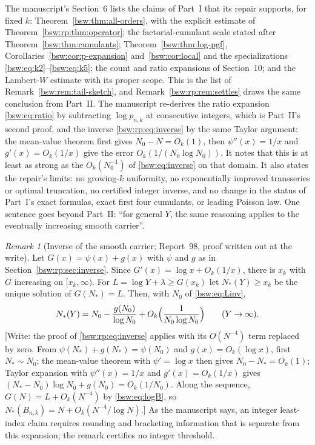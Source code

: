 \documentclass[11pt,letterpaper]{article}
\theoremstyle{definition}
\theoremstyle{remark}
\newtheorem{remark}[theorem]{Remark}
\begin{document}
The manuscript's Section~6 lists the claims of Part~I that its repair
supports, for fixed $k$: Theorem~\ref{bsw:thm:all-orders}, with the
explicit estimate of Theorem~\ref{bsw:rp:thm:operator}; the
factorial-cumulant scale stated after Theorem~\ref{bsw:thm:cumulants};
Theorem~\ref{bsw:thm:log-pgf}, Corollaries~\ref{bsw:cor:p-expansion}
and~\ref{bsw:cor:local} and the specializations
\eqref{bsw:eq:k2}--\eqref{bsw:eq:k5}; the count and ratio expansions of
Section~10; and the Lambert-$W$ estimate with its proper scope.  This is
the list of Remark~\ref{bsw:rem:tail-sketch}, and
Remark~\ref{bsw:rp:rem:settles} draws the same conclusion from Part~II.
The manuscript re-derives the ratio expansion \eqref{bsw:eq:ratio} by
subtracting $\log p_{n,k}$ at consecutive integers, which is Part~II's
second proof, and the inverse \eqref{bsw:rp:eq:inverse} by the same Taylor
argument: the mean-value theorem first gives $N_0-N=O_k(1)$, then
$\psi''(x)=1/x$ and $g'(x)=O_k(1/x)$ give the error
$O_k(1/(N_0\log N_0))$.  It notes that this is at least as strong as the
$O_k(N_0^{-1})$ of \eqref{bsw:eq:inverse} on that domain.  It also states
the repair's limits: no growing-$k$ uniformity, no exponentially improved
transseries or optimal truncation, no certified integer inverse, and no
change in the status of Part~I's exact formulas, exact first four
cumulants, or leading Poisson law.  One sentence goes beyond Part~II:
``for general $Y$, the same reasoning applies to the eventually increasing
smooth carrier''.

\begin{remark}[Inverse of the smooth carrier; Report~98, proof written out
at the write]\label{bsw:ut:rem:carrier}
Let $G(x)=\psi(x)+g(x)$ with $\psi$ and $g$ as in
Section~\ref{bsw:rp:sec:inverse}.  Since
$G'(x)=\log x+O_k(1/x)$, there is $x_k$ with $G$ increasing on
$[x_k,\infty)$.  For $L=\log Y+\lambda\ge G(x_k)$ let $N_*(Y)\ge x_k$ be
the unique solution of $G(N_*)=L$.  Then, with $N_0$ of
\eqref{bsw:eq:Linv},
\[
 N_*(Y)=N_0-\frac{g(N_0)}{\log N_0}+O_k\Bigl(\frac1{N_0\log N_0}\Bigr)
 \qquad(Y\to\infty).
\]
[Write: the proof of \eqref{bsw:rp:eq:inverse} applies with its
$O(N^{-4})$ term replaced by zero.  From $\psi(N_*)+g(N_*)=\psi(N_0)$ and
$g(x)=O_k(\log x)$, first $N_*\sim N_0$; the mean-value theorem with
$\psi'=\log x$ then gives $N_0-N_*=O_k(1)$; Taylor expansion with
$\psi''(x)=1/x$ and $g'(x)=O_k(1/x)$ gives
$(N_*-N_0)\log N_0+g(N_0)=O_k(1/N_0)$.  Along the sequence,
$G(N)=L+O_k(N^{-4})$ by \eqref{bsw:eq:logB}, so
$N_*(B_{n,k})=N+O_k(N^{-4}/\log N)$.]  As the manuscript says, an integer
least-index claim requires rounding and bracketing information that is
separate from this expansion; the remark certifies no integer threshold.
\end{remark}
\end{document}
